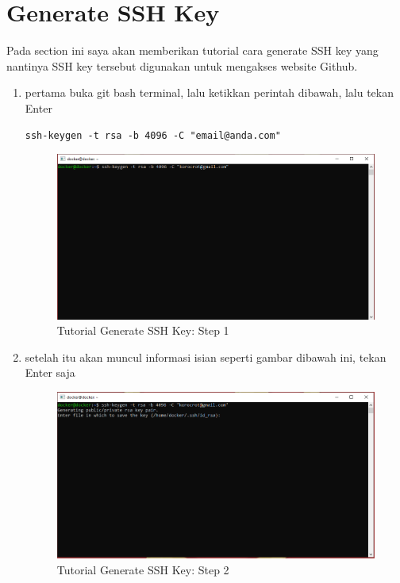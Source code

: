 \section{Generate SSH Key}
Pada section ini saya akan memberikan tutorial cara generate SSH key yang nantinya SSH key tersebut digunakan untuk mengakses website Github.
\begin{enumerate}
\item pertama buka git bash terminal, lalu ketikkan perintah dibawah, lalu tekan Enter
\begin{lstlisting}
ssh-keygen -t rsa -b 4096 -C "email@anda.com"
\end{lstlisting}
\begin{figure}[H]
        \centerline{\includegraphics[scale=0.5]{figures/generate-ssh-key/step1}}
        \caption{Tutorial Generate SSH Key: Step 1}
\end{figure}
\item setelah itu akan muncul informasi isian seperti gambar dibawah ini, tekan Enter saja
\begin{figure}[H]
        \centerline{\includegraphics[scale=0.5]{figures/generate-ssh-key/step2}}
        \caption{Tutorial Generate SSH Key: Step 2}
\end{figure}

\end{enumerate}
